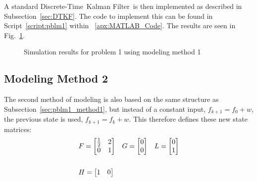 \documentclass[]{article}
\renewcommand{\lstlistingname}{Script}
\newcommand{\scriptname}{\lstlistingname}
\newcommand{\KF}{Kalman Filter}
\newcommand{\DT}{Discrete-Time}
\newcommand{\DTKF}{\DT \ \KF}
\newcommand{\subsectionname}{Subsection}
\renewcommand{\figurename}{Fig.}
\begin{document}
		A standard \DTKF \ is then implemented as described in \subsectionname \ \ref{sec:DTKF}. The code to implement this can be found in \scriptname \ \ref{script:pblm1} within \appendixname \ \ref{apx:MATLAB_Code}. The results are seen in \figurename \ \ref{fig:pblm1resultsmethod1}.\\
		
		\begin{figure}[h]
			\centering
			\caption{Simulation results for problem 1 using modeling method 1}
			\label{fig:pblm1resultsmethod1}
		\end{figure}
				
	\newpage
	\subsection{Modeling Method 2}\label{sec:pblm1_method2}
		The second method of modeling is also based on the same structure as \subsectionname \ \ref{sec:pblm1_method1}, but instead of a constant input, $f_{k+1} = f_0 + w$, the previous state is used, $f_{k+1} = f_k + w$. This therefore defines these new state matrices:
		\begin{equation}
			\begin{aligned}
				&F = \mqty[\frac{1}{2} & 2\\ 0 & 1] \ \ \ G = \mqty[0\\ 0] \ \ \ L = \mqty[0\\ 1]\\
				\\
				&H = \mqty[1 &0]
			\end{aligned}
		\end{equation}
	
\end{document}
